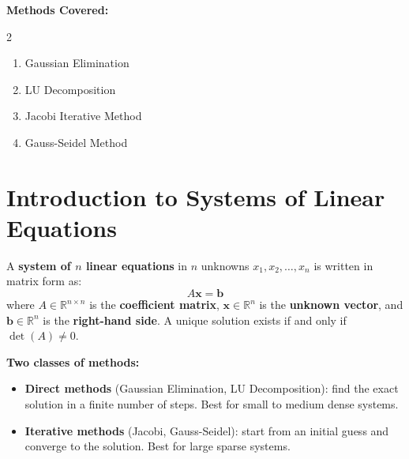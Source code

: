 \documentclass[12pt]{article}
\begin{document}
\vspace{8pt}

\begin{tcolorbox}[colback=lightbg, colframe=accent, arc=4pt, boxrule=1pt,
  left=12pt, right=12pt, top=10pt, bottom=10pt]
\textbf{\color{primary}Methods Covered:}
\begin{multicols}{2}
\begin{enumerate}[noitemsep]
  \item Gaussian Elimination
  \item LU Decomposition
  \item Jacobi Iterative Method
  \item Gauss-Seidel Method
\end{enumerate}
\end{multicols}
\end{tcolorbox}

\newpage

\section*{Introduction to Systems of Linear Equations}

\begin{defbox}
A \textbf{system of $n$ linear equations} in $n$ unknowns $x_1, x_2, \ldots, x_n$ is written in matrix form as:
\[
  A\mathbf{x} = \mathbf{b}
\]
where $A \in \mathbb{R}^{n\times n}$ is the \textbf{coefficient matrix}, $\mathbf{x} \in \mathbb{R}^n$ is the \textbf{unknown vector}, and $\mathbf{b} \in \mathbb{R}^n$ is the \textbf{right-hand side}. A unique solution exists if and only if $\det(A) \neq 0$.
\end{defbox}

\begin{keybox}
\textbf{Two classes of methods:}
\begin{itemize}[noitemsep, topsep=4pt]
  \item \textbf{Direct methods} (Gaussian Elimination, LU Decomposition): find the exact solution in a finite number of steps. Best for small to medium dense systems.
  \item \textbf{Iterative methods} (Jacobi, Gauss-Seidel): start from an initial guess and converge to the solution. Best for large sparse systems.
\end{itemize}
\end{keybox}
\end{document}
